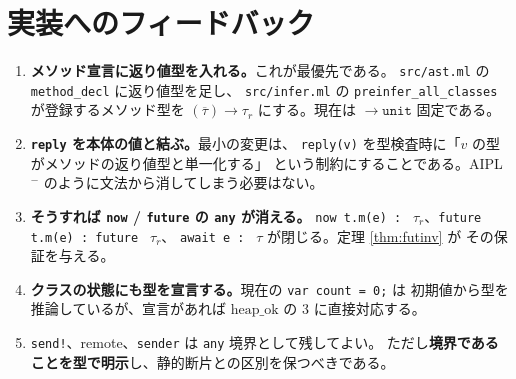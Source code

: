 \documentclass[11pt,a4paper]{ltjsarticle}
\theoremstyle{definition}
\theoremstyle{remark}
\newcommand{\tunit}{\mathtt{unit}}
\newcommand{\heapok}{\mathrm{heap\_ok}}
\begin{document}
\section{実装へのフィードバック}

\begin{enumerate}
\item \textbf{メソッド宣言に返り値型を入れる。}これが最優先である。
      \verb|src/ast.ml| の \verb|method_decl| に返り値型を足し、
      \verb|src/infer.ml| の \verb|preinfer_all_classes| が登録するメソッド型を
      $(\overline{\tau}) \to \tau_r$ にする。現在は $\to \tunit$ 固定である。
\item \textbf{\texttt{reply} を本体の値と結ぶ。}最小の変更は、
      \verb|reply(v)| を型検査時に「$v$ の型がメソッドの返り値型と単一化する」
      という制約にすることである。AIPL$^-$ のように文法から消してしまう必要はない。
\item \textbf{そうすれば \texttt{now} / \texttt{future} の \texttt{any} が消える。}
      \verb|now t.m(e) : | $\tau_r$、\verb|future t.m(e) : future | $\tau_r$、
      \verb|await e : | $\tau$ が閉じる。定理 \ref{thm:futinv} が
      その保証を与える。
\item \textbf{クラスの状態にも型を宣言する。}現在の \verb|var count = 0;| は
      初期値から型を推論しているが、宣言があれば $\heapok$ の 3 に直接対応する。
\item \verb|send!|、remote、\verb|sender| は \verb|any| 境界として残してよい。
      ただし\textbf{境界であることを型で明示}し、静的断片との区別を保つべきである。
\end{enumerate}
\end{document}
